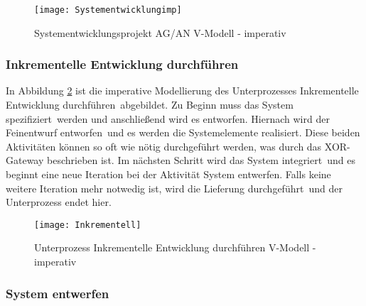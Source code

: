 \begin{figure}[!htbp]
\begin{center}
  \texttt{[image: Systementwicklungimp]} %
  \caption{Systementwicklungsprojekt AG/AN  V-Modell - imperativ}
  \label{fig:Systementwicklungimp}
\end{center}
\end{figure}




\subsubsection{Inkrementelle Entwicklung durchführen}
In Abbildung \ref{fig:Inkrementell} ist die imperative Modellierung des Unterprozesses \grqq Inkrementelle Entwicklung durchführen\grqq \ abgebildet. \newline
Zu Beginn muss das \grqq System spezifiziert\grqq \ werden und anschließend wird es entworfen. \newline
Hiernach wird der \grqq Feinentwurf entworfen\grqq \ und es werden die \grqq Systemelemente realisiert\grqq. Diese beiden Aktivitäten können so oft wie nötig durchgeführt werden, was durch das XOR-Gateway beschrieben ist.  \newline
Im nächsten Schritt wird das \grqq System integriert\grqq \ und es beginnt eine neue Iteration bei der Aktivität System entwerfen.\newline
Falls keine weitere Iteration mehr notwedig ist, wird die \grqq Lieferung durchgeführt\grqq \ und der Unterprozess endet hier. \newline

\begin{figure}[!htbp]
\begin{center}
  \texttt{[image: Inkrementell]} %
  \caption{Unterprozess Inkrementelle Entwicklung durchführen V-Modell - imperativ}
  \label{fig:Inkrementell}
\end{center}
\end{figure}



\clearpage


\subsubsection{System entwerfen}

